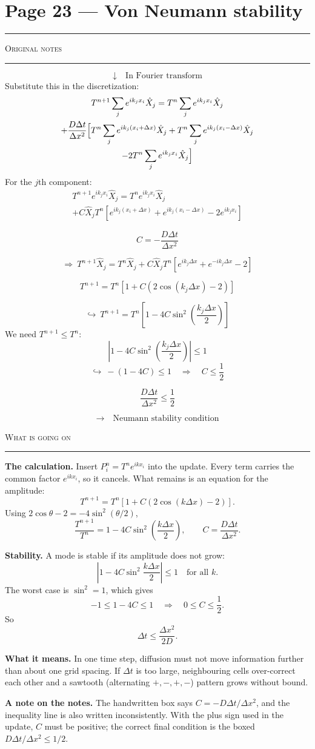 \documentclass[10pt,a4paper]{article}
\newcommand{\pairpage}[3]{%
  \clearpage
  \section*{\normalsize Page #1}
  \vspace{-0.9em}
  {\color{black!35}\rule{\linewidth}{0.4pt}}\par\vspace{0.2em}
  \noindent
  \begin{minipage}[t]{0.473\textwidth}
    {\scriptsize\textsc{Original notes}}\par\vspace{0.15em}
    {\color{black!25}\rule{\linewidth}{0.3pt}}\par\vspace{0.2em}
    #2
  \end{minipage}%
  \hfill
  \begin{minipage}[t]{0.473\textwidth}
    {\scriptsize\textsc{What is going on}}\par\vspace{0.15em}
    {\color{black!25}\rule{\linewidth}{0.3pt}}\par\vspace{0.2em}
    #3
  \end{minipage}%
}
\begin{document}
\pairpage{23 --- Von Neumann stability}{%
\[
\downarrow\quad\text{In Fourier transform}
\]
Substitute this in the discretization:
\begin{multline*}
T^{n+1}\sum_j e^{ik_jx_i}\hat X_j
=T^n\sum_j e^{ik_jx_i}\hat X_j\\
+\frac{D\Delta t}{\Delta x^2}
\Bigl[T^n\sum_j e^{ik_j(x_i+\Delta x)}\hat X_j
+T^n\sum_j e^{ik_j(x_i-\Delta x)}\hat X_j\\
-2T^n\sum_j e^{ik_jx_i}\hat X_j\Bigr]
\end{multline*}
For the $j$th component:
\begin{multline*}
T^{n+1}e^{ik_jx_i}\hat X_j
=T^ne^{ik_jx_i}\hat X_j\\
+C\hat X_jT^n
\left[e^{ik_j(x_i+\Delta x)}+e^{ik_j(x_i-\Delta x)}
-2e^{ik_jx_i}\right]
\end{multline*}
\begin{handbox}
\[
C=-\frac{D\Delta t}{\Delta x^2}
\]
\end{handbox}
\[
\Rightarrow\ T^{n+1}\hat X_j
=T^n\hat X_j+C\hat X_jT^n
\left[e^{ik_j\Delta x}+e^{-ik_j\Delta x}-2\right]
\]
\begin{handbox}
\[
T^{n+1}=T^n\left[1+C(2\cos(k_j\Delta x)-2)\right]
\]
\end{handbox}
\[
\hookrightarrow\ T^{n+1}
=T^n\left[1-4C\sin^2\left(\frac{k_j\Delta x}{2}\right)\right]
\]
We need $T^{n+1}\le T^n$:
\[
\left|1-4C\sin^2\left(\frac{k_j\Delta x}{2}\right)\right|\le1
\]
\[
\hookrightarrow\ -(1-4C)\le1
\quad\Longrightarrow\quad
\boxed{C\le\frac12}
\]
\begin{handbox}
\[
\frac{D\Delta t}{\Delta x^2}\le\frac12
\]
\end{handbox}
\[
\longrightarrow\quad\text{Neumann stability condition}
\]
}{%
\textbf{The calculation.} Insert
$P_i^n=T^n e^{ikx_i}$ into the update. Every term carries the common
factor $e^{ikx_i}$, so it cancels. What remains is an equation for the
amplitude:
\[
T^{n+1}=T^n\left[1+C(2\cos(k\Delta x)-2)\right].
\]
Using $2\cos\theta-2=-4\sin^2(\theta/2)$,
\[
\frac{T^{n+1}}{T^n}
=1-4C\sin^2\left(\frac{k\Delta x}{2}\right),
\qquad C=\frac{D\Delta t}{\Delta x^2}.
\]

\textbf{Stability.} A mode is stable if its amplitude does not grow:
\[
\left|1-4C\sin^2\frac{k\Delta x}{2}\right|\le1
\quad\text{for all }k.
\]
The worst case is $\sin^2=1$, which gives
\[
-1\le1-4C\le1
\quad\Longrightarrow\quad
0\le C\le\frac12.
\]
So
\[
\boxed{\Delta t\le\frac{\Delta x^2}{2D}}.
\]

\textbf{What it means.} In one time step, diffusion must not move
information further than about one grid spacing. If $\Delta t$ is too
large, neighbouring cells over-correct each other and a sawtooth
(alternating $+,-,+,-$) pattern grows without bound.

\textbf{A note on the notes.} The handwritten box says
$C=-D\Delta t/\Delta x^2$, and the inequality line is also written
inconsistently. With the plus sign used in the update, $C$ must be
positive; the correct final condition is the boxed
$D\Delta t/\Delta x^2\le1/2$.
}
\end{document}
